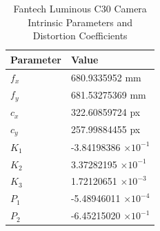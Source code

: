 \documentclass[conference]{IEEEtran}
\begin{document}


\begin{table}[htbp]
\caption{Fantech Luminous C30 Camera Intrinsic Parameters and Distortion Coefficients}
\centering %

\renewcommand{\arraystretch}{1.5}

\begin{tabularx}{\columnwidth}{ Y Y }
\toprule
\textbf{Parameter} & \textbf{Value} \\
\midrule
$f_x$ & 680.9335952 mm \\
$f_y$ & 681.53275369 mm \\
$c_x$ & 322.60859724 px \\
$c_y$ & 257.99884455 px \\
$K_1$ & -3.84198386 $\times 10^{-1}$ \\
$K_2$ & 3.37282195 $\times 10^{-1}$ \\
$K_3$ & 1.72120651 $\times 10^{-3}$ \\
$P_1$ & -5.48946011 $\times 10^{-4}$ \\
$P_2$ & -6.45215020 $\times 10^{-1}$ \\
\bottomrule
\end{tabularx}
\label{tab1}
\end{table}
\end{document}
